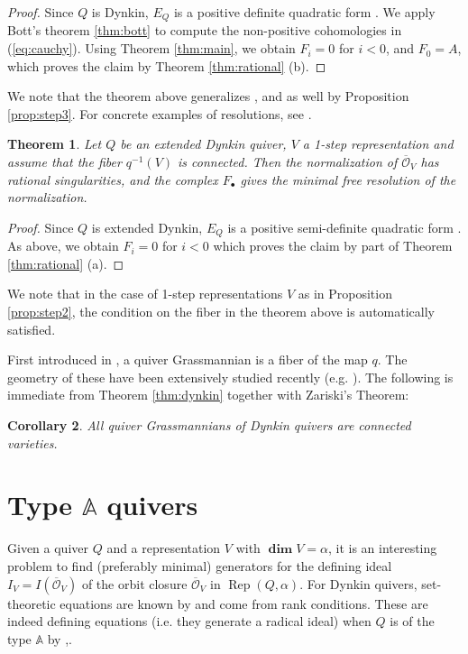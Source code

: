 \documentclass[twoside]{article}
\newcommand{\orb}{\mathcal{O}}
\newcommand{\ove}{\overline}
\DeclareMathOperator{\Dim}{\mathbf{dim}}
\newcommand{\Rep}{\operatorname{Rep}}
\newcommand{\A}{\mathbb{A}}
\newtheorem{theorem}{Theorem}[section]
\newtheorem{corollary}[theorem]{Corollary}
\theoremstyle{definition}
\begin{document}
\begin{proof}\label{thm:dynkin}
Since $Q$ is Dynkin, $E_Q$ is a positive definite quadratic form \cite{quad}. We apply Bott's theorem \ref{thm:bott} to compute the non-positive cohomologies in (\ref{eq:cauchy}). Using Theorem \ref{thm:main}, we obtain $F_i=0$ for $i<0$, and $F_0=A$, which proves the claim by Theorem \ref{thm:rational} (b).
\end{proof}

We note that the theorem above generalizes \cite[Theorem 3.5]{kavita},  and  \cite[Theorem 3.5]{lol} as well by Proposition \ref{prop:step3}.  For concrete examples of resolutions, see \cite{kavita2,kavita}.

\begin{theorem}\label{thm:extended}
Let $Q$ be an extended Dynkin quiver, $V$ a 1-step representation and assume that the fiber $q^{-1}(V)$ is connected. Then the normalization of $\overline{\orb}_V$ has rational singularities, and the complex $F_\bullet$ gives the minimal free resolution of the normalization.
\end{theorem}

\begin{proof}
Since $Q$ is extended Dynkin, $E_Q$ is a positive semi-definite quadratic form \cite{quad}. As above, we obtain $F_i=0$ for $i<0$ which proves the claim by part of Theorem \ref{thm:rational} (a).
\end{proof}

We note that in the case of 1-step representations $V$ as in Proposition \ref{prop:step2}, the condition on the fiber in the theorem above is automatically satisfied.

\vspace{0.1in}

First introduced in \cite{scho}, a quiver Grassmannian is a fiber of the map $q$. The geometry of these have been extensively studied recently (e.g. \cite{quivgrass}). The following is immediate from Theorem \ref{thm:dynkin} together with Zariski's Theorem:

\begin{corollary} All quiver Grassmannians of Dynkin quivers are connected varieties.
\end{corollary}

\section{Type $\A$ quivers}\label{sec:type}

Given a quiver $Q$ and a representation $V$ with $\Dim V=\alpha$, it is an interesting problem to find (preferably minimal) generators for the defining ideal $I_V=I(\ove{\orb}_V)$ of the orbit closure $\overline{\orb}_V$ in $\Rep(Q,\alpha)$. For Dynkin quivers, set-theoretic equations are known by \cite{bong} and come from rank conditions. These are indeed defining equations (i.e. they generate a radical ideal) when $Q$ is of the type $\A$ by \cite{lak},\cite{scheme}.
\end{document}
